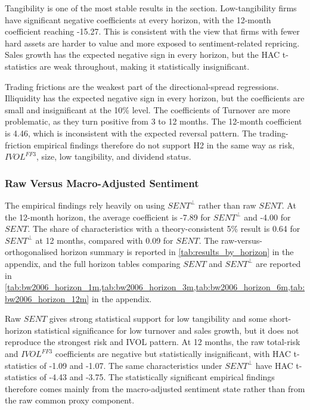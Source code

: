 \documentclass[11pt]{article}
\newcommand{\var}[1]{\ensuremath{#1}}
\begin{document}
Tangibility is one of the most stable results in the section. Low-tangibility firms have significant negative coefficients at every horizon, with the 12-month coefficient reaching -15.27. This is consistent with the view that firms with fewer hard assets are harder to value and more exposed to sentiment-related repricing. Sales growth has the expected negative sign in every horizon, but the HAC t-statistics are weak throughout, making it statistically insignificant.

Trading frictions are the weakest part of the directional-spread regressions. Illiquidity has the expected negative sign in every horizon, but the coefficients are small and insignificant at the 10\% level. The coefficients of Turnover are more problematic, as they turn positive from 3 to 12 months. The 12-month coefficient is 4.46, which is inconsistent with the expected reversal pattern. The trading-friction empirical findings therefore do not support H2 in the same way as risk, \var{IVOL^{FF3}}, size, low tangibility, and dividend status.

\subsubsection{Raw Versus Macro-Adjusted Sentiment}
The empirical findings rely heavily on using \var{SENT^{\perp}} rather than raw \var{SENT}. At the 12-month horizon, the average coefficient is -7.89 for \var{SENT^{\perp}} and -4.00 for \var{SENT}. The share of characteristics with a theory-consistent 5\% result is 0.64 for \var{SENT^{\perp}} at 12 months, compared with 0.09 for \var{SENT}. The raw-versus-orthogonalised horizon summary is reported in \cref{tab:results_by_horizon} in the appendix, and the full horizon tables comparing \var{SENT} and \var{SENT^{\perp}} are reported in \cref{tab:bw2006_horizon_1m,tab:bw2006_horizon_3m,tab:bw2006_horizon_6m,tab:bw2006_horizon_12m} in the appendix.

Raw \var{SENT} gives strong statistical support for low tangibility and some short-horizon statistical significance for low turnover and sales growth, but it does not reproduce the strongest risk and IVOL pattern. At 12 months, the raw total-risk and \var{IVOL^{FF3}} coefficients are negative but statistically insignificant, with HAC t-statistics of -1.09 and -1.07. The same characteristics under \var{SENT^{\perp}} have HAC t-statistics of -4.43 and -3.75. The statistically significant empirical findings therefore comes mainly from the macro-adjusted sentiment state rather than from the raw common proxy component.
\end{document}
